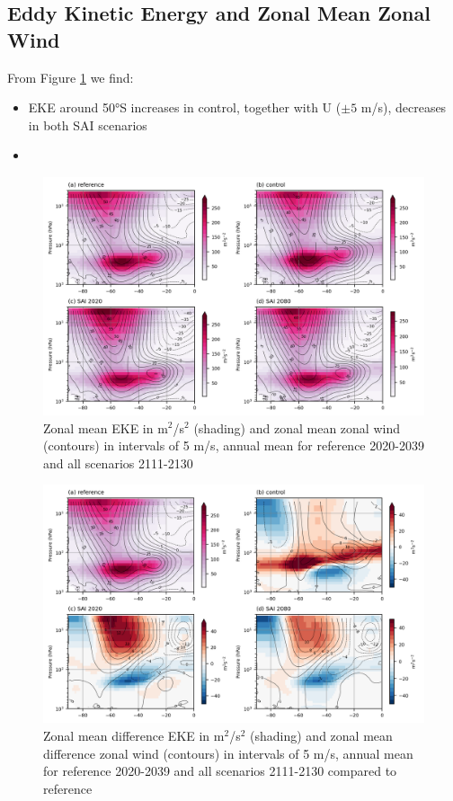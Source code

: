 \subsection{Eddy Kinetic Energy and Zonal Mean Zonal Wind}

From Figure \ref{fig:EKE_U_zm_ann} we find:
\begin{itemize}
    \item EKE around 50°S increases in control, together with U ($\pm 5$ m/s), decreases in both SAI scenarios
    \item 
\end{itemize}

\begin{figure}[H]
    \centering
    \includegraphics[width=\linewidth]{images/EKE_U_zm_ann.png}
    \caption{Zonal mean EKE in m$^2$/s$^2$ (shading) and zonal mean zonal wind (contours) in intervals of 5 m/s, annual mean for reference 2020-2039 and all scenarios 2111-2130}
    \label{fig:EKE_U_zm_ann}
\end{figure}

\begin{figure}[H]
    \centering
    \includegraphics[width=\linewidth]{images/EKE_U_zmdiff_ann.png}
    \caption{Zonal mean difference EKE in m$^2$/s$^2$ (shading) and zonal mean difference zonal wind (contours) in intervals of 5 m/s, annual mean for reference 2020-2039 and all scenarios 2111-2130 compared to reference}
    \label{fig:EKE_U_zmdiff_ann}
\end{figure}

